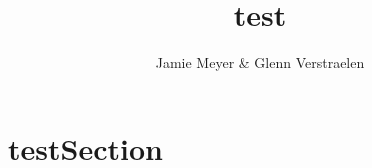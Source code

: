 \documentclass{report}
\begin{document}
	\author{Jamie Meyer & Glenn Verstraelen}
	\title{test}
	
	\maketitle
	
	\section{testSection}
\end{document}

